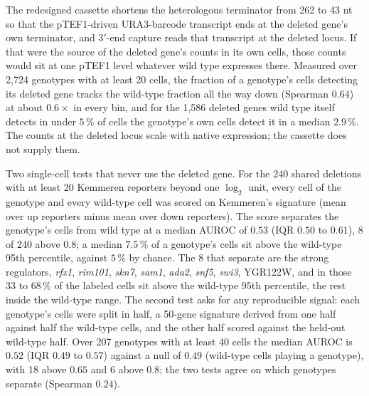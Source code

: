  The redesigned cassette shortens the heterologous terminator from 262 to 43 nt so
that the pTEF1-driven URA3-barcode transcript ends at the deleted gene's own terminator,
and 3$'$-end capture reads that transcript at the deleted locus. If that were the source
of the deleted gene's counts in its own cells, those counts would sit at one pTEF1 level
whatever wild type expresses there. Measured over 2{,}724 genotypes with at least 20
cells, the fraction of a genotype's cells detecting its deleted gene tracks the
wild-type fraction all the way down (Spearman $0.64$) at about $0.6\times$ in every bin,
and for the 1{,}586 deleted genes wild type itself detects in under $5\,\%$ of cells the
genotype's own cells detect it in a median $2.9\,\%$. The counts at the deleted locus
scale with native expression; the cassette does not supply them.

 Two single-cell tests that never use the deleted gene. For
the 240 shared deletions with at least 20 Kemmeren reporters beyond one $\log_2$ unit,
every cell of the genotype and every wild-type cell was scored on Kemmeren's signature
(mean over up reporters minus mean over down reporters). The score separates the
genotype's cells from wild type at a median AUROC of $0.53$ (IQR $0.50$ to $0.61$), 8 of
240 above $0.8$; a median $7.5\,\%$ of a genotype's cells sit above the wild-type 95th
percentile, against $5\,\%$ by chance. The 8 that separate are the strong regulators,
\textit{rfx1}, \textit{rim101}, \textit{skn7}, \textit{sam1}, \textit{ada2},
\textit{snf5}, \textit{swi3}, YGR122W, and in those $33$ to $68\,\%$ of the labeled
cells sit above the wild-type 95th percentile, the rest inside the wild-type range. The
second test asks for any reproducible signal: each genotype's cells were split in half,
a 50-gene signature derived from one half against half the wild-type cells, and the
other half scored against the held-out wild-type half. Over 207 genotypes with at least
40 cells the median AUROC is $0.52$ (IQR $0.49$ to $0.57$) against a null of $0.49$
(wild-type cells playing a genotype), with 18 above $0.65$ and 6 above $0.8$; the two
tests agree on which genotypes separate (Spearman $0.24$).

